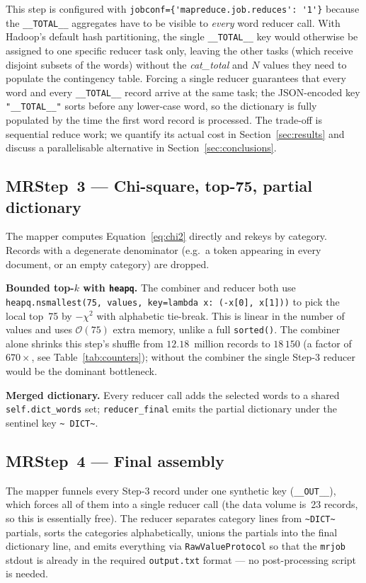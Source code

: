 \documentclass[11pt,a4paper]{article}
\begin{document}
This step is configured with \verb|jobconf={'mapreduce.job.reduces': '1'}|
because the \texttt{\_\_TOTAL\_\_} aggregates have to be visible to
\emph{every} word reducer call. With Hadoop's default hash partitioning,
the single \texttt{\_\_TOTAL\_\_} key would otherwise be assigned to one
specific reducer task only, leaving the other tasks (which receive
disjoint subsets of the words) without the \textit{cat\_total} and $N$
values they need to populate the contingency table.  Forcing a single
reducer guarantees that every word and every \texttt{\_\_TOTAL\_\_}
record arrive at the same task; the JSON-encoded key
\texttt{"\_\_TOTAL\_\_"} sorts before any lower-case word, so the
dictionary is fully populated by the time the first word record is
processed. The trade-off is sequential reduce work; we quantify its
actual cost in Section~\ref{sec:results} and discuss a parallelisable
alternative in Section~\ref{sec:conclusions}.

\subsection{MRStep~3 --- Chi-square, top-75, partial dictionary}

The mapper computes Equation~\ref{eq:chi2} directly and rekeys by
category. Records with a degenerate denominator (e.g.\ a token appearing in
every document, or an empty category) are dropped.

\textbf{Bounded top-$k$ with \texttt{heapq}.}  The combiner and reducer
both use \texttt{heapq.nsmallest(75, values, key=lambda x: (-x[0], x[1]))}
to pick the local top~75 by $-\chi^{2}$ with alphabetic tie-break. This is
linear in the number of values and uses $\mathcal{O}(75)$ extra memory,
unlike a full \texttt{sorted()}.  The combiner alone shrinks this
step's shuffle from $12.18$~million records to $18\,150$ (a factor of
$670\times$, see Table~\ref{tab:counters}); without the combiner the
single Step-3 reducer would be the dominant bottleneck.

\textbf{Merged dictionary.}  Every reducer call adds the selected
words to a shared \texttt{self.dict\_words} set; \texttt{reducer\_final}
emits the partial dictionary under the sentinel key \texttt{\textasciitilde
DICT\textasciitilde}.

\subsection{MRStep~4 --- Final assembly}

The mapper funnels every Step-3 record under one synthetic key
(\texttt{\_\_OUT\_\_}), which forces all of them into a single reducer
call (the data volume is~23 records, so this is essentially free). The
reducer separates category lines from \texttt{\textasciitilde DICT\textasciitilde}
partials, sorts the categories alphabetically, unions the partials into the
final dictionary line, and emits everything via
\texttt{RawValueProtocol} so that the \texttt{mrjob} stdout is already in
the required \texttt{output.txt} format --- no post-processing script is
needed.
\end{document}
